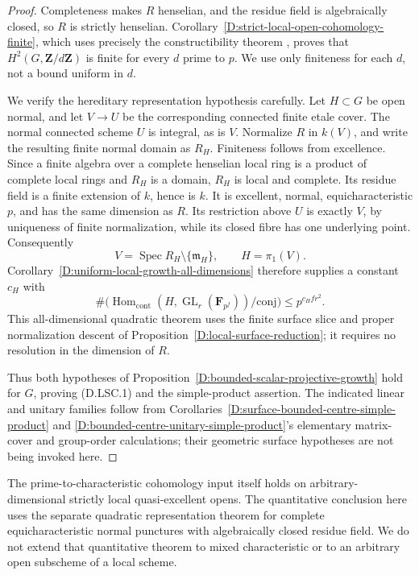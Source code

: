\begin{proof}
Completeness makes $R$ henselian, and the residue field is
algebraically closed, so $R$ is strictly henselian.
Corollary~\ref{D:strict-local-open-cohomology-finite}, which
uses precisely the constructibility theorem
\citep[XIII, Theorem~1.1.1(i)]{A_ILO2014}, proves that
$H^2(G,\mathbf Z/d\mathbf Z)$ is finite for every $d$ prime
to $p$. We use only finiteness for each $d$, not a bound
uniform in $d$.

We verify the hereditary representation hypothesis carefully.
Let $H\subset G$ be open normal, and let $V\to U$ be the
corresponding connected finite etale cover. The normal connected
scheme $U$ is integral, as is $V$. Normalize $R$ in $k(V)$,
and write the resulting finite normal domain as $R_H$.
Finiteness follows from excellence. Since a finite algebra
over a complete henselian local ring is a product of complete
local rings and $R_H$ is a domain, $R_H$ is local and complete.
Its residue field is a finite extension of $k$, hence is $k$.
It is excellent, normal, equicharacteristic $p$, and has the
same dimension as $R$. Its restriction above $U$ is exactly
$V$, by uniqueness of finite normalization, while its closed
fibre has one underlying point. Consequently
\[
       V=\operatorname{Spec}R_H\setminus\{\mathfrak m_H\},
       \qquad H=\pi_1(V).
\]
Corollary~\ref{D:uniform-local-growth-all-dimensions} therefore
supplies a constant $c_H$ with
\[
 \#\bigl(\operatorname{Hom}_{\mathrm{cont}}
       (H,\operatorname{GL}_r(\mathbf F_{p^f}))/\mathrm{conj}\bigr)
                     \le p^{c_Hfr^2}.
\]
This all-dimensional quadratic theorem uses the finite surface
slice and proper normalization descent of
Proposition~\ref{D:local-surface-reduction}; it requires no
resolution in the dimension of $R$.

Thus both hypotheses of
Proposition~\ref{D:bounded-scalar-projective-growth} hold for
$G$, proving (D.LSC.1) and the simple-product assertion.
The indicated linear and unitary families follow from
Corollaries~\ref{D:surface-bounded-centre-simple-product} and
\ref{D:bounded-centre-unitary-simple-product}'s elementary
matrix-cover and group-order calculations; their geometric
surface hypotheses are not being invoked here.
\end{proof}

\begin{remark}
The prime-to-characteristic cohomology input itself holds on
arbitrary-dimensional strictly local quasi-excellent opens.
The quantitative conclusion here uses the separate quadratic
representation theorem for complete equicharacteristic normal
punctures with algebraically closed residue field. We do not
extend that quantitative theorem to mixed characteristic or
to an arbitrary open subscheme of a local scheme.
\end{remark}
